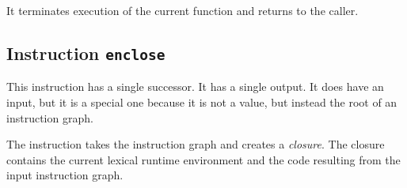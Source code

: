 It terminates execution of the current function and returns to the
caller. 

\subsection{Instruction \texttt{enclose}}
\label{mir-instruction-enclose}

This instruction has a single successor.  It has a single output. 
It does have an input, but it is a special one because it is not a
value, but instead the root of an instruction graph.  

The instruction takes the instruction graph and creates a
\emph{closure}.  The closure contains the current lexical runtime
environment and the code resulting from the input instruction graph.
